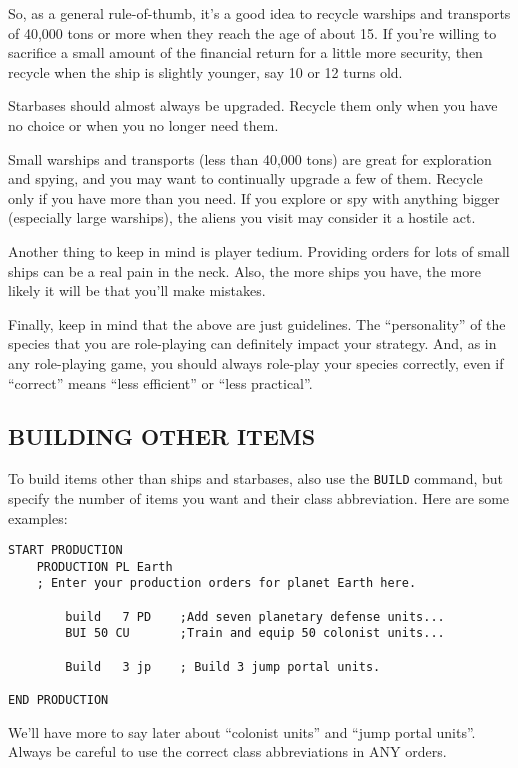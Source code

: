 \documentclass[10pt,titlepage]{article}
\begin{document}
So, as a general rule-of-thumb, it's a good idea to recycle warships and
transports of 40,000 tons or more when they reach the age of about 15.  If
you're willing to sacrifice a small amount of the financial return for a little
more security, then recycle when the ship is slightly younger, say 10 or 12
turns old.

Starbases should almost always be upgraded.  Recycle them only when you have
no choice or when you no longer need them.

Small warships and transports (less than 40,000 tons) are great for exploration
and spying, and you may want to continually upgrade a few of them.  Recycle
only if you have more than you need.  If you explore or spy with anything
bigger (especially large warships), the aliens you visit may consider it a
hostile act.

Another thing to keep in mind is player tedium.  Providing orders for lots of
small ships can be a real pain in the neck.  Also, the more ships you have, the
more likely it will be that you'll make mistakes.

Finally, keep in mind that the above are just guidelines.  The ``personality''
of the species that you are role-playing can definitely impact your strategy.
And, as in any role-playing game, you should always role-play your species
correctly, even if ``correct'' means ``less efficient'' or ``less practical''.


\subsection{BUILDING OTHER ITEMS}
\label{sec:buildingotheritems}


To build items other than ships and starbases, also use the \texttt{BUILD} command, but
specify the number of items you want and their class abbreviation.  Here are
some examples:

\begin{verbatim}
START PRODUCTION
    PRODUCTION PL Earth
    ; Enter your production orders for planet Earth here.

        build   7 PD    ;Add seven planetary defense units...
        BUI 50 CU       ;Train and equip 50 colonist units...

        Build   3 jp    ; Build 3 jump portal units.

END PRODUCTION
\end{verbatim} 

We'll have more to say later about ``colonist units'' and ``jump portal units''.
Always be careful to use the correct class abbreviations in ANY orders.
\end{document}

